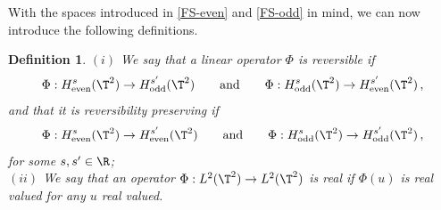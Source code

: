 \documentclass[a4paper,reqno,10pt]{article}
\newtheorem{defi}{Definition}[section]%
\begin{document}
With the spaces introduced in \eqref{FS-even} and \eqref{FS-odd} in mind, we can now introduce the following definitions.
\begin{defi}\label{defi.rev}
	$(i)$ 
    We say that a linear operator $\Phi$ is {\it reversible} if
\begin{equation}
    \Phi:H^s_{\mathrm{even}}(\T^2)\to H^{s'}_{\mathrm{odd}}(\T^2)
\qquad \text{and} \qquad
\Phi:H^s_{\mathrm{odd}}(\T^2)\to H^{s'}_{\rm even}(\T^2) \,,
\end{equation}
and that it is {\it reversibility preserving} if
\begin{equation}
    \Phi:H^s_{\mathrm{even}}(\T^2)\to H^{s'}_{\mathrm{even}}(\T^2)
\qquad \text{and} \qquad
\Phi:H^s_{\mathrm{odd}}(\T^2)\to H^{s'}_{\mathrm{odd}}(\T^2)\,,
\end{equation}
  for some $s,s'\in\R$;    
	\\[1mm]
	\noindent $(ii)$ We say that an operator $\Phi:L^2(\T^2)\to L^2(\T^2)$ is {\it real} if $\Phi(u)$ is real valued for any $u$ real valued.
\end{defi}
\end{document}
